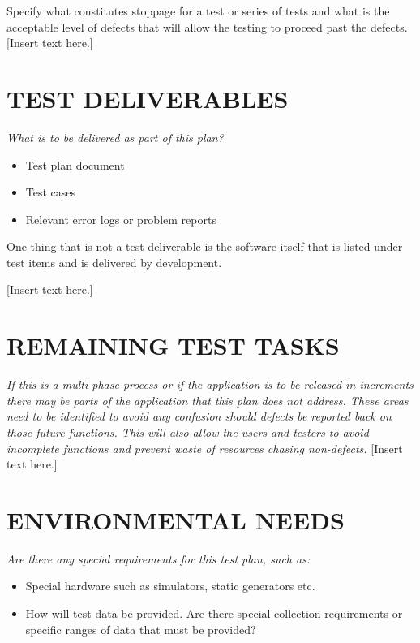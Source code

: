 {{Specify what constitutes stoppage for a test or series of tests and
what is the acceptable level of defects that will allow the testing to
proceed past the defects. 
}
{\color{black}
[Insert text here.]}

\section[TEST DELIVERABLES]{\bfseries\color{black} TEST DELIVERABLES}
{\itshape\color{black}
What is to be delivered as part of this plan?

\begin{itemize}
\item Test plan document
\item Test cases
\item Relevant error logs or problem reports
\end{itemize}
One thing that is not a test deliverable is the software itself that
is listed under test items and is delivered by development.
}
{\color{black}
[Insert text here.]}

\section[REMAINING TEST TASKS]{\bfseries\color{black} REMAINING TEST TASKS}
{\itshape\color{black}
If this is a multi-phase process or if the application is to be
released in increments there may be parts of the application that this
plan does not address. These areas need to be identified to avoid any
confusion should defects be reported back on those future
functions. This will also allow the users and testers to avoid
incomplete functions and prevent waste of resources chasing non-defects.
}
{\color{black}
[Insert text here.]}

\section[ENVIRONMENTAL NEEDS]{\bfseries\color{black} ENVIRONMENTAL NEEDS}
{\itshape\color{black}
Are there any special requirements for this test plan, such as:

\begin{itemize}
\item Special hardware such as simulators, static generators etc.
\item How will test data be provided. Are there special collection
	requirements or specific ranges of data that must be provided? 
\end{itemize}

}}
